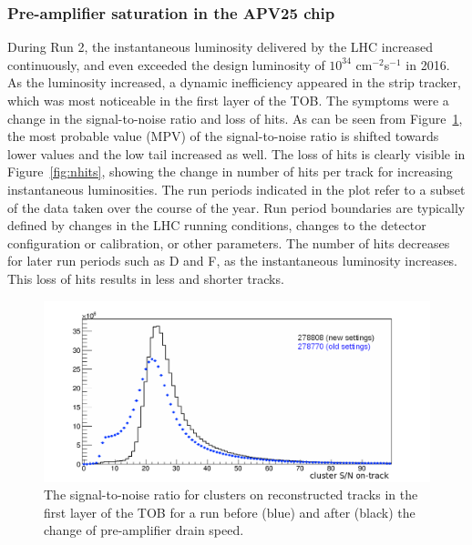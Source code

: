 \subsubsection{Pre-amplifier saturation in the APV25 chip}

During Run 2, the instantaneous luminosity delivered by the \ac{LHC} increased continuously, and even exceeded the design luminosity of $10^{34}$ cm$^{-2}$s$^{-1}$ in 2016. As the luminosity increased, a dynamic inefficiency appeared in the strip tracker, which was most noticeable in the first layer of the \ac{TOB}. The symptoms were a change in the signal-to-noise ratio and loss of hits. As can be seen from Figure~\ref{fig:SOverN}, the most probable value (MPV) of the signal-to-noise ratio is shifted towards lower values and the low tail increased as well. The loss of hits is clearly visible in Figure~\ref{fig:nhits}, showing the change in number of hits per track for increasing instantaneous luminosities. The run periods indicated in the plot refer to a subset of the data taken over the course of the year. Run period boundaries are typically defined by changes in the \ac{LHC} running conditions, changes to the detector configuration or calibration, or other parameters. The number of hits decreases for later run periods such as D and F, as the instantaneous luminosity increases. This loss of hits results in less and shorter tracks.
  
\begin{figure}[ht]
  \centering
 \includegraphics[width=.9\textwidth]{APVsaturation_SOverN}
 \caption{The signal-to-noise ratio for clusters on reconstructed tracks in the first layer of the \ac{TOB} for a run before (blue) and after (black) the change of pre-amplifier drain speed.}
 \label{fig:SOverN}
\end{figure}
  
